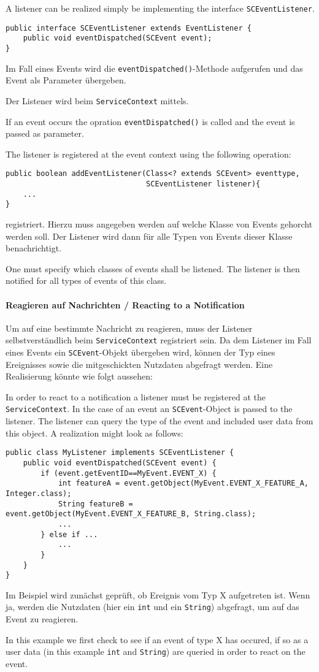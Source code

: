 \documentclass[10pt,a4paper]{scrartcl}
\providecommand{\deng}[2]{#1 / {\sffamily #2}}
\providecommand{\deutsch}[1]{#1}
\providecommand{\englisch}[1]{{\sffamily #1}}
\begin{document}
\englisch{A listener can be realized simply be implementing the interface 
\texttt{SCEventListener}.}

\begin{lstlisting}
public interface SCEventListener extends EventListener {
	public void eventDispatched(SCEvent event);
}
\end{lstlisting}
\deutsch{Im Fall eines Events wird die \texttt{eventDispatched()}-Methode 
aufgerufen und das Event als Parameter übergeben.

Der Listener wird beim \texttt{ServiceContext} mittels.}

\englisch{If an event occurs the opration \texttt{eventDispatched()} is called 
and the event is passed as parameter.

The listener is registered at the event context using the following operation:}

\begin{lstlisting}
public boolean addEventListener(Class<? extends SCEvent> eventtype,
                                SCEventListener listener){ 
	...
}
\end{lstlisting}

\deutsch{registriert. Hierzu muss angegeben werden auf welche Klasse von Events
gehorcht werden soll. Der Listener wird dann für alle Typen von Events dieser 
Klasse benachrichtigt.}

\englisch{One must specify which classes of events shall be listened. The 
listener is then notified for all types of events of this class.}


\paragraph{\deng{Reagieren auf Nachrichten}{Reacting to a Notification}}
\deutsch{Um auf eine bestimmte Nachricht zu reagieren, muss der Listener
selbstverständlich beim \texttt{ServiceContext} registriert sein. Da dem
Listener im Fall eines Events ein \texttt{SCEvent}-Objekt übergeben wird, können
der Typ eines Ereignisses sowie die mitgeschickten Nutzdaten abgefragt werden.
Eine Realisierung könnte wie folgt aussehen:}

\englisch{In order to react to a notification a listener must be registered at
the \texttt{ServiceContext}. In the case of an event an \texttt{SCEvent}-Object
is passed to the listener. The listener can query the type of the event and
included user data from this object. A realization might look as follows:}

\begin{lstlisting}
public class MyListener implements SCEventListener {
	public void eventDispatched(SCEvent event) {
		if (event.getEventID==MyEvent.EVENT_X) {
			int featureA = event.getObject(MyEvent.EVENT_X_FEATURE_A, Integer.class);
			String featureB = event.getObject(MyEvent.EVENT_X_FEATURE_B, String.class);
			...
		} else if ...
			...
		}
	}
}
\end{lstlisting}
\deutsch{Im Beispiel wird zunächst geprüft, ob Ereignis vom Typ X aufgetreten
ist. Wenn ja, werden die Nutzdaten (hier ein \texttt{int} und ein
\texttt{String}) abgefragt, um auf das Event zu reagieren.}

\englisch{In this example we first check to see if an event of type X has
occured, if so as a user data (in this example \texttt{int} and \texttt{String}) 
are queried in order to react on the event.}
\end{document}
